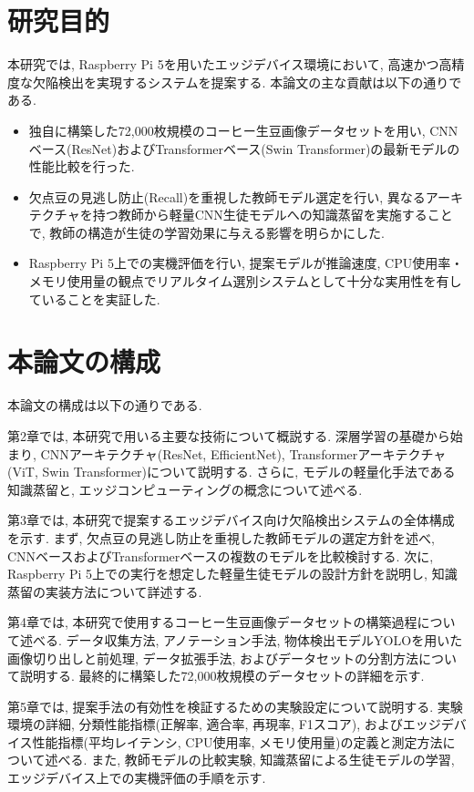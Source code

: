 \section{研究目的}
本研究では, Raspberry Pi 5を用いたエッジデバイス環境において, 高速かつ高精度な欠陥検出を実現するシステムを提案する. 
本論文の主な貢献は以下の通りである.

\begin{itemize}
\item 独自に構築した72,000枚規模のコーヒー生豆画像データセットを用い, CNNベース(ResNet)およびTransformerベース(Swin Transformer)の最新モデルの性能比較を行った.
\item 欠点豆の見逃し防止(Recall)を重視した教師モデル選定を行い, 異なるアーキテクチャを持つ教師から軽量CNN生徒モデルへの知識蒸留を実施することで, 教師の構造が生徒の学習効果に与える影響を明らかにした.
\item Raspberry Pi 5上での実機評価を行い, 提案モデルが推論速度, CPU使用率・メモリ使用量の観点でリアルタイム選別システムとして十分な実用性を有していることを実証した.
\end{itemize}

\section{本論文の構成}
本論文の構成は以下の通りである.

第2章では, 本研究で用いる主要な技術について概説する. 
深層学習の基礎から始まり, CNNアーキテクチャ(ResNet, EfficientNet), Transformerアーキテクチャ(ViT, Swin Transformer)について説明する. 
さらに, モデルの軽量化手法である知識蒸留と, エッジコンピューティングの概念について述べる.

第3章では, 本研究で提案するエッジデバイス向け欠陥検出システムの全体構成を示す. 
まず, 欠点豆の見逃し防止を重視した教師モデルの選定方針を述べ, CNNベースおよびTransformerベースの複数のモデルを比較検討する. 
次に, Raspberry Pi 5上での実行を想定した軽量生徒モデルの設計方針を説明し, 知識蒸留の実装方法について詳述する.

第4章では, 本研究で使用するコーヒー生豆画像データセットの構築過程について述べる. 
データ収集方法, アノテーション手法, 物体検出モデルYOLOを用いた画像切り出しと前処理, データ拡張手法, およびデータセットの分割方法について説明する. 
最終的に構築した72,000枚規模のデータセットの詳細を示す.

第5章では, 提案手法の有効性を検証するための実験設定について説明する. 
実験環境の詳細, 分類性能指標(正解率, 適合率, 再現率, F1スコア), およびエッジデバイス性能指標(平均レイテンシ, CPU使用率, メモリ使用量)の定義と測定方法について述べる. 
また, 教師モデルの比較実験, 知識蒸留による生徒モデルの学習, エッジデバイス上での実機評価の手順を示す.

